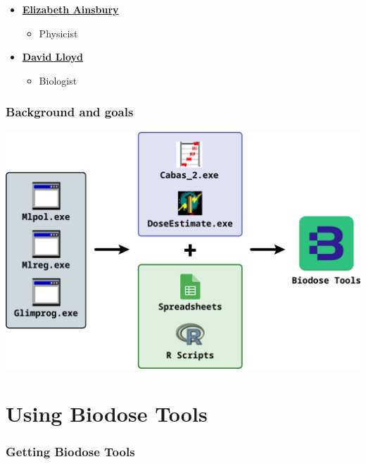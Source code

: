 \documentclass[]{scrartcl}
\providecommand{\tightlist}{%
  \setlength{\itemsep}{0pt}\setlength{\parskip}{0pt}}
\begin{document}
\begin{itemize}
\tightlist
\item
  \textbf{\href{https://www.phe-protectionservices.org.uk/cds/team/liz_ainsbury}{Elizabeth Ainsbury}}

  \begin{itemize}
  \tightlist
  \item
    Physicist
  \end{itemize}
\item
  \textbf{\href{https://www.phe-protectionservices.org.uk/cds/team/david_lloyd}{David Lloyd}}

  \begin{itemize}
  \tightlist
  \item
    Biologist
  \end{itemize}
\end{itemize}

\hypertarget{background-and-goals}{%
\section*{Background and goals}\label{background-and-goals}}

\includegraphics{images/intro/chronology.pdf}

\hypertarget{part-using-biodose-tools}{%
\part{Using Biodose Tools}\label{part-using-biodose-tools}}

\hypertarget{get}{%
\section{Getting Biodose Tools}\label{get}}
\end{document}
